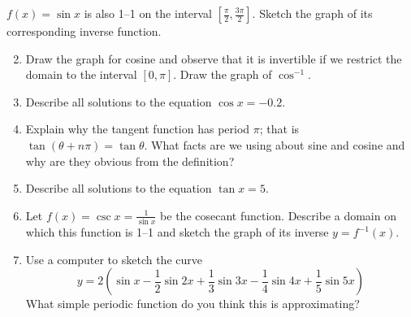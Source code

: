\goodbreak


\begin{exercises}
	\exstart $f(x)=\sin x$ is also 1--1 on the interval $[\frac\pi 2,\frac{3\pi}2]$. Sketch the graph of its corresponding inverse function.
	
	\begin{enumerate}\setcounter{enumi}{1}
	  \item Draw the graph for cosine and observe that it is invertible if we restrict the domain to the interval $[0,\pi]$. Draw the graph of $\cos^{-1}$.
	  
	  \item Describe all solutions to the equation $\cos x=-0.2$.
	  
	  \item Explain why the tangent function has period $\pi$; that is $\tan(\theta+n\pi)=\tan \theta$. What facts are we using about sine and cosine and why are they obvious from the definition?
	  
	  \item Describe all solutions to the equation $\tan x=5$.
	  
	  \item Let $f(x)=\csc x=\frac 1{\sin x}$ be the cosecant function. Describe a domain on which this function is 1--1 and sketch the graph of its inverse $y=f^{-1}(x)$.
	  
	  \item Use a computer to sketch the curve
	  \[
	  	y=2\left(\sin x-\frac 12\sin 2x+\frac 13\sin 3x-\frac 14\sin 4x+\frac 15\sin 5x\right)
	  \]
	  What simple periodic function do you think this is approximating?
	\end{enumerate}
\end{exercises}

\clearpage


